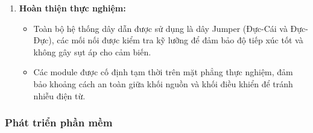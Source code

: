 \documentclass[../BTL_PTIT.tex]{subfiles}
\begin{document}
\begin{itemize}[label=\textbullet]
\begin{enumerate}[label=\roman*.]
\begin{itemize}[label=\textperiodcentered]
            \item \textbf{Kết nối điều khiển quạt:} Các chân GPIO điều khiển từ ESP32 được dẫn tới đầu vào (Input) của module Relay. Quạt được nối vào tiếp điểm của Relay, sử dụng nguồn 5V trực tiếp từ hệ thống nguồn chung.
            
            \item \textbf{Thiết lập hệ thống nguồn nối tầng:}
            \begin{enumerate}[label=\arabic*.]
                \item Nguồn từ Adapter (qua Jack DC) và nguồn từ Pin 18650 cùng đi vào mạch YX850 để thực hiện chức năng tự động chuyển đổi khi mất điện.
                
                \item Đầu ra của YX850 được nối tới mạch hạ áp LM2596 để điều chỉnh điện áp về mức 5V ổn định.
                
                \item Nguồn 5V sau hạ áp được dẫn tới breadboard để nuôi ESP32, các cảm biến và cấp điện cho Relay/Quạt.
            \end{enumerate}
        \end{itemize}
        
        \item \textbf{Hoàn thiện thực nghiệm:}
        \begin{itemize}[label=\textperiodcentered]
            \item Toàn bộ hệ thống dây dẫn được sử dụng là dây Jumper (Đực-Cái và Đực-Đực), các mối nối được kiểm tra kỹ lưỡng để đảm bảo độ tiếp xúc tốt và không gây sụt áp cho cảm biến.
            
            \item Các module được cố định tạm thời trên mặt phẳng thực nghiệm, đảm bảo khoảng cách an toàn giữa khối nguồn và khối điều khiển để tránh nhiễu điện từ.
        \end{itemize}
    \end{enumerate}
\end{itemize}

\subsubsection{Phát triển phần mềm}
\end{document}
